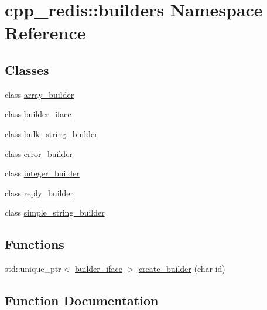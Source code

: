 \hypertarget{namespacecpp__redis_1_1builders}{}\section{cpp\+\_\+redis\+:\+:builders Namespace Reference}
\label{namespacecpp__redis_1_1builders}
\subsection*{Classes}
\begin{DoxyCompactItemize}
\item 
class \hyperlink{classcpp__redis_1_1builders_1_1array__builder}{array\+\_\+builder}
\item 
class \hyperlink{classcpp__redis_1_1builders_1_1builder__iface}{builder\+\_\+iface}
\item 
class \hyperlink{classcpp__redis_1_1builders_1_1bulk__string__builder}{bulk\+\_\+string\+\_\+builder}
\item 
class \hyperlink{classcpp__redis_1_1builders_1_1error__builder}{error\+\_\+builder}
\item 
class \hyperlink{classcpp__redis_1_1builders_1_1integer__builder}{integer\+\_\+builder}
\item 
class \hyperlink{classcpp__redis_1_1builders_1_1reply__builder}{reply\+\_\+builder}
\item 
class \hyperlink{classcpp__redis_1_1builders_1_1simple__string__builder}{simple\+\_\+string\+\_\+builder}
\end{DoxyCompactItemize}
\subsection*{Functions}
\begin{DoxyCompactItemize}
\item 
std\+::unique\+\_\+ptr$<$ \hyperlink{classcpp__redis_1_1builders_1_1builder__iface}{builder\+\_\+iface} $>$ \hyperlink{namespacecpp__redis_1_1builders_a979249c968665425f0bbfae631d68eeb}{create\+\_\+builder} (char id)
\end{DoxyCompactItemize}


\subsection{Function Documentation}
\mbox{\label{namespacecpp__redis_1_1builders_a979249c968665425f0bbfae631d68eeb}} 
